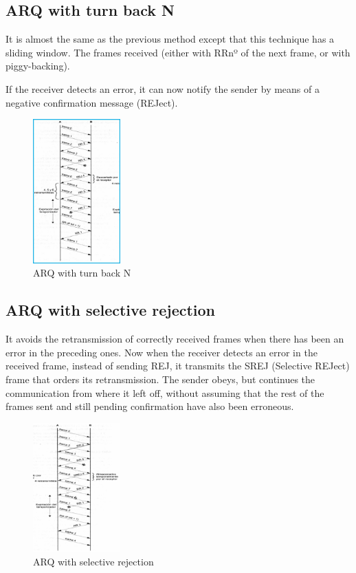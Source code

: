 \documentclass[journal,trans]{IEEEtran}
\begin{document}
\subsection{\textbf{ ARQ with turn back N}}

It is almost the same as the previous method except that this technique has a sliding window. The frames received (either with RRnº of the next frame, or with piggy-backing).

If the receiver detects an error, it can now notify the sender by means of a negative confirmation message (REJect).

\begin{figure}[h]
    \includegraphics[width=0.3\textwidth]{ARQ-TurnB.jpg}
    \centering
    \caption{ARQ with turn back N}
    \label{fig:my_label3}
\end{figure}

\subsection{\textbf{ ARQ with selective rejection}}

It avoids the retransmission of correctly received frames when there has been an error in the preceding ones. Now when the receiver detects an error in the received frame, instead of sending REJ, it transmits the SREJ (Selective REJect) frame that orders its retransmission. The sender obeys, but continues the communication from where it left off, without assuming that the rest of the frames sent and still pending confirmation have also been erroneous.

\begin{figure}[h]
    \includegraphics[width=0.3\textwidth]{ARQ-rechazo.jpg}
    \centering
    \caption{ARQ with selective rejection}
    \label{fig:my_label4}
\end{figure}
\end{document}
